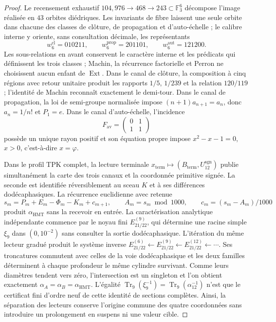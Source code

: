 \begin{proof}
Le recensement exhaustif
\(104,976\to468\to243\subset\mathbb F_3^6\) décompose l'image réalisée
en \(43\) orbites diédriques. Les invariants de fibre laissent une seule orbite
dans chacune des classes de clôture, de propagation et d'auto-échelle ; le calibre
interne y oriente, sans consultation décimale, les représentants
\[
 w_6^{\mathrm{cl}}=010211,
 \qquad w_6^{\mathrm{prop}}=201101,
 \qquad w_6^{\mathrm{aut}}=121200.
\]
Les sous-relations en avant conservent le caractère interne et les prédicats qui
définissent les trois classes ; Machin, la récurrence factorielle et Perron ne choisissent
aucun enfant de \(\operatorname{Ext}\). Dans le
canal de clôture, la composition à cinq régions avec retour unitaire produit
les rapports \(1/5\), \(1/239\) et la relation \(120/119\) ; l'identité de
Machin reconnaît exactement le demi-tour. Dans le canal de propagation, la
loi de semi-groupe normalisée impose
\((n+1)a_{n+1}=a_n\), donc \(a_n=1/n!\) et \(P_1=e\). Dans le canal
d'auto-échelle, l'incidence
\[
 F_{\mathrm{av}}=\begin{pmatrix}0&1\\1&1\end{pmatrix}
\]
possède un unique rayon positif et son équation propre impose
\(x^2-x-1=0\), \(x>0\), c'est-à-dire \(x=\varphi\).

Dans le profil TPK complet, la lecture terminale
\(x_{\mathrm{term}}\mapsto(B_{\mathrm{term}},U_{12}^{\mathrm{sgn}})\)
publie simultanément la carte des trois canaux et la coordonnée
primitive signée. La
seconde est identifiée réversiblement au sceau \(K\) et à ses différences
dodécaphasiques. La récurrence euclidienne avec retenue
\[
 s_m=P_m+E_m-\Phi_m-K_m+c_{m+1},\qquad
 A_m=s_m\bmod1000,\qquad
 c_m=(s_m-A_m)/1000
\]
produit \(\alpha_{\mathrm{HMT}}\) sans la recevoir en entrée. La
caractérisation analytique indépendante commence par le noyau fini
\(E_{21/22}^{(9)}\), qui détermine une racine simple \(\xi_9\) dans
\((0,10^{-2})\) sans consulter la sortie dodécaphasique. L'itération du même
lecteur gradué produit le système inverse
\(E_{21/22}^{(6)}\leftarrow E_{21/22}^{(9)}\leftarrow
E_{21/22}^{(12)}\leftarrow\cdots\). Ses troncatures commutent avec celles de la
voie dodécaphasique et les deux familles déterminent à chaque profondeur le même
cylindre survivant. Comme leurs diamètres tendent vers zéro, l'intersection est
un singleton et l'on obtient exactement
\(\alpha_A=\alpha_B=\alpha_{\mathrm{HMT}}\). L'égalité
\(\operatorname{Tr}_9(\xi_9^{-1})=
\operatorname{Tr}_9(\alpha_{12}^{-1})\) n'est que le certificat fini
d'ordre neuf de cette identité de sections complètes. Ainsi, la séparation
des lecteurs conserve l'origine commune des quatre coordonnées sans introduire
un prolongement en suspens ni une valeur cible.
\end{proof}

